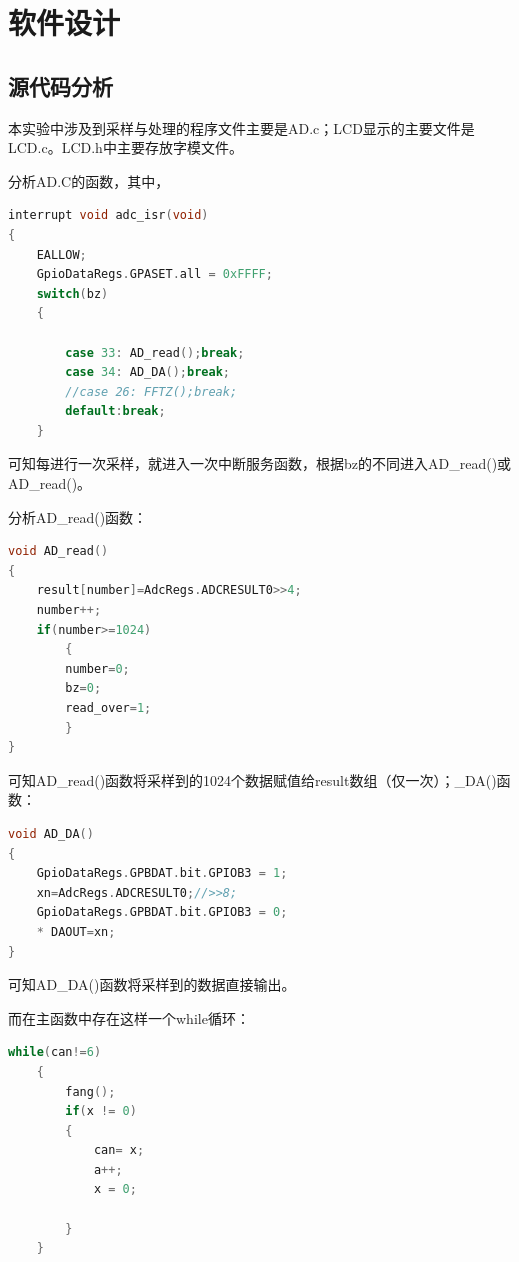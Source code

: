 \documentclass[12pt]{article}
\begin{document}
\section{软件设计}
\setcounter{table}{0}\setcounter{figure}{0}\setcounter{equation}{0}
\subsection{源代码分析}
本实验中涉及到采样与处理的程序文件主要是AD.c；LCD显示的主要文件是LCD.c。LCD.h中主要存放字模文件。\par
分析AD.C的函数，其中，
\begin{lstlisting}[language=C]
interrupt void adc_isr(void)
{	
	EALLOW;
    GpioDataRegs.GPASET.all = 0xFFFF;
    switch(bz)
	{
    	
		case 33: AD_read();break;
		case 34: AD_DA();break;
        //case 26: FFTZ();break;
        default:break;
    }
\end{lstlisting}
可知每进行一次采样，就进入一次中断服务函数，根据bz的不同进入AD\_read()或AD\_read()。\par
分析AD\_read()函数：\par
\begin{lstlisting}[language=C]
void AD_read()
{	
	result[number]=AdcRegs.ADCRESULT0>>4;
	number++;
	if(number>=1024)
		{
		number=0;
		bz=0;
		read_over=1;
		}
}
\end{lstlisting}
可知AD\_read()函数将采样到的1024个数据赋值给result数组（仅一次）；\_DA()函数：
\begin{lstlisting}[language=C]
void AD_DA()
{
	GpioDataRegs.GPBDAT.bit.GPIOB3 = 1;
	xn=AdcRegs.ADCRESULT0;//>>8;
	GpioDataRegs.GPBDAT.bit.GPIOB3 = 0;
	* DAOUT=xn;
}
\end{lstlisting}
可知AD\_DA()函数将采样到的数据直接输出。\par
而在主函数中存在这样一个while循环：
\begin{lstlisting}[language=C]
while(can!=6)
    {
     	fang();
	    if(x != 0)
		{
			can= x;
			a++;
			x = 0;
			
	    }
	}
\end{lstlisting}
\end{document}
